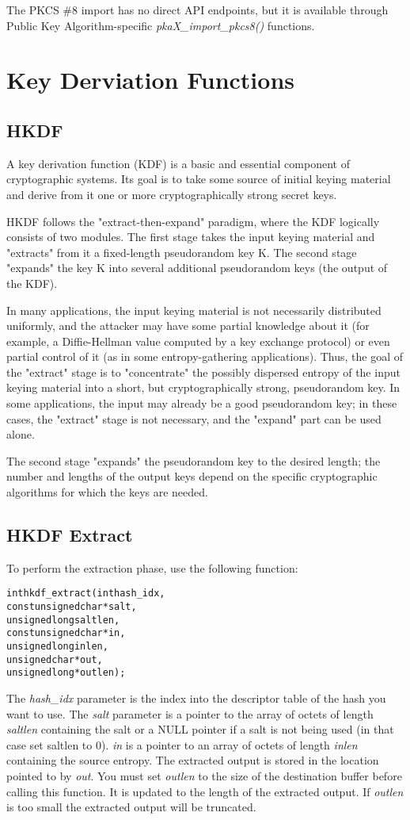 \documentclass[synpaper]{book}
\newcommand{\mysection}[1]    %
	{                   %
	\section{#1}
   \markboth{\textsf{www.libtom.net}}{\thesection ~ {#1}}
	}
\begin{document}
The PKCS \#8 import has no direct API endpoints, but it is available through Public Key Algorithm-specific
\textit{pkaX\_import\_pkcs8()} functions.


\mysection{Key Derviation Functions}
\subsection{HKDF}
A key derivation function (KDF) is a basic and essential component of cryptographic systems.  Its goal is to take some source of initial
keying material and derive from it one or more cryptographically strong secret keys.

HKDF follows the "extract-then-expand" paradigm, where the KDF logically consists of two modules.  The first stage takes the input
keying material and "extracts" from it a fixed-length pseudorandom key K.  The second stage "expands" the key K into several additional
pseudorandom keys (the output of the KDF).

In many applications, the input keying material is not necessarily distributed uniformly, and the attacker may have some partial
knowledge about it (for example, a Diffie-Hellman value computed by a key exchange protocol) or even partial control of it (as in some
entropy-gathering applications).  Thus, the goal of the "extract" stage is to "concentrate" the possibly dispersed entropy of the input
keying material into a short, but cryptographically strong, pseudorandom key.  In some applications, the input may already be a
good pseudorandom key; in these cases, the "extract" stage is not necessary, and the "expand" part can be used alone.

The second stage "expands" the pseudorandom key to the desired length; the number and lengths of the output keys depend on the
specific cryptographic algorithms for which the keys are needed.

\subsection{HKDF Extract}
To perform the extraction phase, use the following function:

\begin{alltt}
int hkdf_extract(   int  hash_idx,
    const unsigned char *salt,
          unsigned long  saltlen,
    const unsigned char *in,
          unsigned long  inlen,
          unsigned char *out,
          unsigned long *outlen);
\end{alltt}
The \textit{hash\_idx} parameter is the index into the descriptor table of the hash you want to use.
The \textit{salt} parameter is a pointer to the array of octets of length \textit{saltlen} containing the salt or a NULL pointer if a salt is not being used (in that case set saltlen to 0).
\textit{in} is a pointer to an array of octets of length \textit{inlen} containing the source entropy.  The extracted output is stored in the location pointed to by \textit{out}.
You must set \textit{outlen} to the size of the destination buffer before calling this function. It is updated to the length of the extracted output. If \textit{outlen} is too small the extracted output will be truncated.
\end{document}

